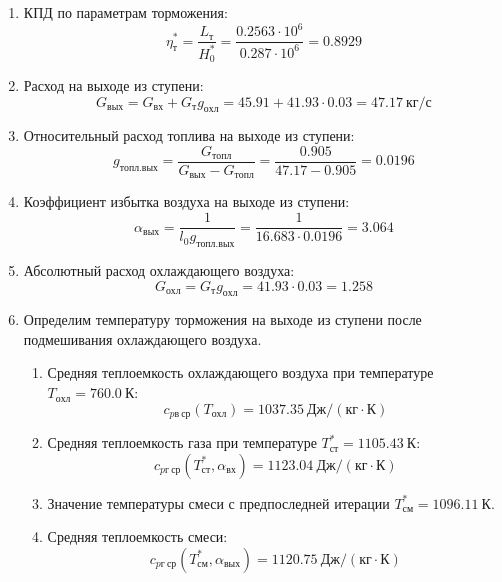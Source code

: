\documentclass[a4paper,12pt]{article}
\begin{document}
\begin{enumerate}
        \item КПД по параметрам торможения:
        \[
            \eta_т^* = \frac{ L_т }{ H_0^* } =
                \frac{
                    0.2563 \cdot 10^6
                }{
                    0.287 \cdot 10^6 } =
            0.8929
        \]

        \item Расход на выходе из ступени:
        \[
            G_{вых} = G_{вх} + G_т g_{охл} =
                45.91 + 41.93 \cdot
                0.03 =
            47.17 \ кг/с
        \]

        \item Относительный расход топлива на выходе из ступени:
        \[
            g_{топл.вых} = \frac{ G_{топл} }{ G_{вых} - G_{топл} } =
                 \frac{ 0.905 }{ 47.17 - 0.905 } =
            0.0196
        \]

        \item Коэффициент избытка воздуха на выходе из ступени:
        \[
            \alpha_{вых} = \frac{ 1 }{ l_0 g_{топл.вых} } =
                \frac{ 1 }{ 16.683 \cdot 0.0196 } =
            3.064
        \]

        \item Абсолютный расход охлаждающего воздуха:
        \[
            G_{охл} = G_т g_{охл} = 41.93 \cdot 0.03 =
            1.258
        \]

        \item Определим температуру торможения на выходе из ступени после подмешивания охлаждающего воздуха.
        \begin{enumerate}

            \item Средняя теплоемкость охлаждающего воздуха при температуре $T_{охл} = 760.0\ К $:
            \[
                c_{pв\ ср} (T_{охл}) = 1037.35\ Дж/ (кг \cdot К)
            \]

            \item Средняя теплоемкость газа при температуре $T_{ст}^* = 1105.43 \ К $:
            \[
                c_{pг\ ср} (T_{ст}^*, \alpha_{вх}) =
                1123.04\ Дж/ (кг \cdot К)
            \]

            \item Значение температуры смеси с предпоследней итерации $T_{см}^{*} = 1096.11\ К$.

            \item Средняя теплоемкость смеси:
            \[
                c_{pг\ ср} (T_{см}^{*}, \alpha_{вых}) =
                1120.75\ Дж/ (кг \cdot К)
            \]


\end{enumerate}
\end{enumerate}
\end{document}
